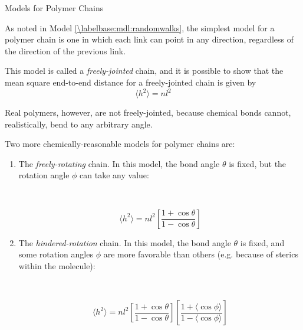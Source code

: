 \begin{activity}{Models for Polymer Chains}
\begin{ctqs}
\end{ctqs}

\begin{model}
\label{\labelbase:mdl:chainmodels}

	As noted in Model \ref{\labelbase:mdl:randomwalks}, the simplest model for a polymer chain is one in which each link can point in any direction, regardless of the direction of the previous link.
	
	This model is called a \emph{freely-jointed} chain, and it is possible to show that the mean square end-to-end distance for a freely-jointed chain is given by
	\begin{equation*}
		\langle h^2\rangle =nl^2
	\end{equation*}
	
	Real polymers, however, are not freely-jointed, because chemical bonds cannot, realistically, bend to any arbitrary angle.
	
	Two more chemically-reasonable models for polymer chains are:
	
	\begin{enumerate}
		\item The \emph{freely-rotating} chain.  In this model, the bond angle $\theta$ is fixed, but the rotation angle $\phi$ can take any value:
		
			\begin{minipage}[t]{0.45\textwidth}
				\vspace{1in}~
			\end{minipage}%
			\begin{minipage}[t]{0.45\textwidth}
				\begin{equation*}
					\langle h^2\rangle = n l^2 \left[\frac{1+\cos\theta}{1-\cos\theta}\right]
				\end{equation*}
			\end{minipage}
		
		\item The \emph{hindered-rotation} chain.  In this model, the bond angle $\theta$ is fixed, and some rotation angles $\phi$ are more favorable than others (e.g. because of sterics within the molecule):
		
			\begin{minipage}[t]{0.45\textwidth}
				\vspace{1in}~
			\end{minipage}%
			\begin{minipage}[t]{0.45\textwidth}
				\begin{equation*}
					\langle h^2\rangle = n l^2 \left[\frac{1+\cos\theta}{1-\cos\theta}\right] \left[\frac{1+\langle \cos\phi\rangle}{1-\langle\cos\phi\rangle}\right]
				\end{equation*}
			\end{minipage}
			

\end{enumerate}
\end{model}
\end{activity}
